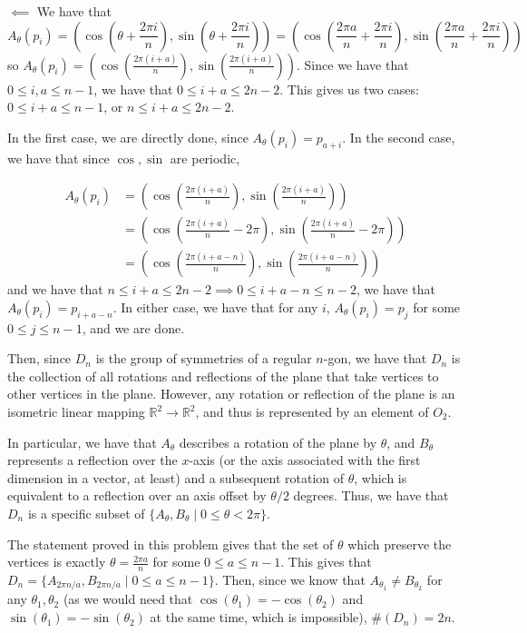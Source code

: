 \documentclass[12pt,letterpaper]{article}
\theoremstyle{definition}
\newcommand{\R}{\mathbb{R}}
\begin{document}
\(\impliedby\) We have that
\[
  A_{\theta}\left(p_{i}\right) = \left(\cos\left(\theta + \frac{2\pi i}{n}\right), \sin\left(\theta + \frac{2\pi i}{n}\right)\right) = \left(\cos\left(\frac{2\pi a}{n} + \frac{2\pi i}{n}\right), \sin\left(\frac{2\pi a}{n} + \frac{2\pi i}{n}\right)\right)
\]
so \(A_{\theta}(p_{i}) = (\cos(\frac{2\pi (i + a)}{n}), \sin(\frac{2\pi (i + a)}{n}))\). Since we have that \(0 \leq i, a \leq n - 1\), we have that \(0 \leq i + a \leq 2n - 2\). This gives us two cases: \(0 \leq i + a \leq n - 1\), or \(n \leq i + a \leq 2n -2\).

In the first case, we are directly done, since \(A_{\theta}(p_{i}) = p_{a + i}\). In the second case, we have that since \(\cos, \sin\) are periodic,

\begin{align*}
  A_{\theta}\left(p_{i}\right) &= \left(\cos\left(\frac{2\pi \left(i + a\right)}{n}\right), \sin\left(\frac{2\pi \left(i + a\right)}{n}\right)\right) \\
                    &=\left(\cos\left(\frac{2\pi \left(i + a\right)}{n} - 2\pi\right), \sin\left(\frac{2\pi \left(i + a\right)}{n}-2\pi\right)\right)\\
                    &= \left(\cos\left(\frac{2\pi \left(i + a - n\right)}{n}\right), \sin\left(\frac{2\pi \left(i + a-n\right)}{n}\right)\right)
\end{align*}
and we have that \(n \leq i + a \leq 2n -2 \implies 0 \leq i + a - n \leq n-2\), we have that \(A_{\theta}(p_{i}) = p_{i + a - n}\). In either case, we have that for any \(i\), \(A_{\theta}(p_{i}) = p_{j}\) for some \(0 \leq j \leq n - 1\), and we are done.

Then, since \(D_{n}\) is the group of symmetries of a regular \(n\)-gon, we have that \(D_{n}\) is the collection of all rotations and reflections of the plane that take vertices to other vertices in the plane. However, any rotation or reflection of the plane is an isometric linear mapping \(\R^{2} \rightarrow \R^{2}\), and thus is represented by an element of \(O_{2}\).

In particular, we have that \(A_{\theta}\) describes a rotation of the plane by \(\theta\), and \(B_{\theta}\) represents a reflection over the \(x\)-axis (or the axis associated with the first dimension in a vector, at least) and a subsequent rotation of \(\theta\), which is equivalent to a reflection over an axis offset by \(\theta / 2\) degrees. Thus, we have that \(D_{n}\) is a specific subset of \(\{A_{\theta}, B_{\theta} \mid 0 \leq \theta < 2\pi\}\).

The statement proved in this problem gives that the set of \(\theta\) which preserve the vertices is exactly \(\theta = \frac{2\pi a}{n}\) for some \(0 \leq a \leq n -1\). This gives that \(D_{n} = \{A_{2\pi n / a}, B_{2\pi n / a} \mid 0 \leq a \leq n - 1\}\). Then, since we know that \(A_{\theta_{1}} \neq B_{\theta_{2}}\) for any \(\theta_{1}, \theta_{2}\) (as we would need that \(\cos(\theta_{1}) = -\cos(\theta_{2})\) and \(\sin(\theta_{1}) = -\sin(\theta_{2})\) at the same time, which is impossible), \(\#(D_{n}) = 2n\).
\end{document}
